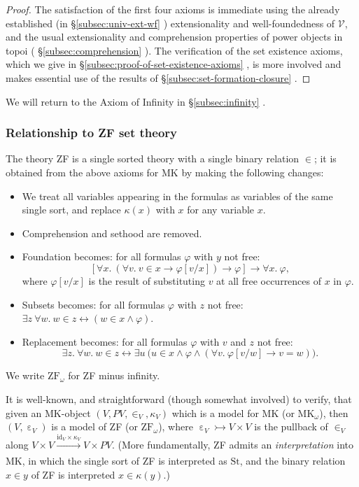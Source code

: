 \documentclass{amsart}
\newcommand\cV{\mathcal{V}}
\newcommand\ein{\mathrel{\varepsilon}}
\newcommand\id{\mathrm{id}}
\newcommand\MKo{\mathrm{MK}_{\omega}}
\newcommand\pbig[1]{\big({#1}\big)}
\renewcommand\phi{\varphi}
\newcommand\St{\mathrm{St}}
\newcommand\tot{\leftrightarrow}
\newcommand\tox[2][]{\xrightarrow[#1]{#2}}
\newcommand\tto{\rightarrowtail}
\newcommand\unein{{\ein}}
\newcommand\unin{{\in}}
\newcommand\ZFo{\mathrm{ZF}_\omega}
\newcommand\prerefpost[3]{%
  \texorpdfstring%
    {\hyperref[#2]{#1\ref*{#2}#3}}%
    {#1\ref*{#2}#3}%
}
\newcommand\sref[1]{\prerefpost{\S}{#1}{}}
\theoremstyle{definition}
\theoremstyle{remark}
\theoremstyle{plainwithref}
\begin{document}
\begin{proof}
  The satisfaction of the first four axioms is immediate using the already established (in \sref{subsec:univ-ext-wf}) extensionality and well-foundedness of \( \cV \), and the usual extensionality and comprehension properties of power objects in topoi (\sref{subsec:comprehension}).
  The verification of the set existence axioms, which we give in \sref{subsec:proof-of-set-existence-axioms}, is more involved and makes essential use of the results of \sref{subsec:set-formation-closure}.
\end{proof}
\noindent
We will return to the Axiom of Infinity in \sref{subsec:infinity}.

\subsubsection{Relationship to ZF set theory} \label{subsubsec:relation-to-zf}
The theory ZF is a single sorted theory with a single binary relation \( \unin \); it is obtained from the above axioms for MK by making the following changes:
\begin{itemize}
  \item We treat all variables appearing in the formulas as variables of the same single sort, and replace \( \kappa(x) \) with \( x \) for any variable \( x \).
  \item Comprehension and sethood are removed.
  \item Foundation becomes: for all formulas \( \phi \) with \( y \) not free:
    \[
      [\forall x.\ (\forall v.\ v \in x \to \phi[v/x] ) \to \phi] \to \forall x.\ \phi,
    \]
where \( \phi[v/x] \) is the result of substituting \( v \) at all free occurrences of \( x \) in \( \phi \).
  \item Subsets becomes: for all formulas \( \phi \) with \( z \) not free: \( \exists z\ \forall w.\ w \in z \tot ( w \in x \wedge \phi ) \).
  \item Replacement becomes: for all formulas \( \phi \) with \( v \) and \( z \) not free:
    \[
      \exists z.\ \forall w.\ w \in z \tot \exists u\ \pbig{u \in x \wedge \phi \wedge (\forall v.\ \phi[v/w] \to v = w)}.
    \]
\end{itemize}
We write \( \ZFo \) for ZF minus infinity.

It is well-known, and straightforward (though somewhat involved) to verify, that given an MK-object \( (V, PV, \in_V, \kappa_V) \) which is a model for MK (or \( \MKo \)), then \( (V, \ein_V) \) is a model of ZF (or \( \ZFo \)), where \( \unein_V \tto V \times V \) is the pullback of \( \in_V \) along \( V \times V \tox{\id_V \times \kappa_V} V \times P V \).
(More fundamentally, ZF admits an \emph{interpretation} into MK, in which the single sort of ZF is interpreted as \( \St \), and the binary relation \( x \in y \) of ZF is interpreted \( x \in \kappa(y) \).)
\end{document}
